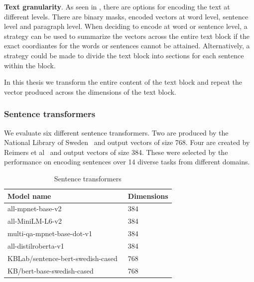 \documentclass[oneside, english, bibtex]{kththesis}
\begin{document}
\textbf{Text granularity}. As seen in , there are options for encoding the text at different levels. There are binary masks, encoded vectors at word level, sentence level and paragraph level. When deciding to encode at word or sentence level, a strategy can be used to summarize the vectors across the entire text block if the exact coordiantes for the words or sentences cannot be attained. Alternatively, a strategy could be made to divide the text block into sections for each sentence within the block. 

In this thesis we transform the entire content of the text block and repeat the vector produced across the dimensions of the text block. 

\subsubsection{Sentence transformers}

We evaluate six different sentence transformers. Two are produced by the National Library of Sweden~\cite{swedish-bert} and output vectors of size 768. Four are created by Reimers et al~\cite{reimers-2019-sentence-bert, reimers-2020-multilingual-sentence-bert} and output vectors of size 384. These were selected by the performance on encoding sentences over 14 diverse tasks from different domains. 

\begin{table}[H]
  \begin{center}
    \caption{Sentence transformers}
    \label{tab:modeldimensions}
    \begin{tabular}{l|l}
    \textbf{Model name} & \textbf{Dimensions}  \\
    \hline
    all-mpnet-base-v2~\cite{reimers-2019-sentence-bert, reimers-2020-multilingual-sentence-bert} & 384 \\    \hline
    all-MiniLM-L6-v2~\cite{reimers-2019-sentence-bert, reimers-2020-multilingual-sentence-bert} & 384 \\    \hline
    multi-qa-mpnet-base-dot-v1~\cite{reimers-2019-sentence-bert, reimers-2020-multilingual-sentence-bert} & 384 \\    \hline
    all-distilroberta-v1~\cite{reimers-2019-sentence-bert, reimers-2020-multilingual-sentence-bert} & 384 \\    \hline
    KBLab/sentence-bert-swedish-cased~\cite{swedish-bert} & 768 \\    \hline
    KB/bert-base-swedish-cased~\cite{swedish-bert} & 768 \\    \hline
    \end{tabular}
  \end{center}
\end{table}
\end{document}
